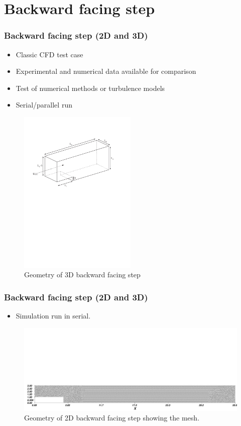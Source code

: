 \section{Backward facing step}

\begin{frame}
    \frametitle{Backward facing step (2D and 3D)}
\begin{itemize}
\item Classic CFD test case
\item Experimental and numerical data available for comparison
\item Test of numerical methods or turbulence models
\item Serial/parallel run
\end{itemize}
\begin{figure}
\centering
\includegraphics[width=0.5\textwidth]{./backward_facing_step/backward_facing_step_3d-schematic}
\caption{Geometry of 3D backward facing step}
\end{figure}
\end{frame}
%
\begin{frame}
    \frametitle{Backward facing step (2D and 3D)}
\begin{itemize}
\item Simulation run in serial.
\end{itemize}
\begin{figure}
\centering
\includegraphics[width=1.0\textwidth]{./backward_facing_step/backward_facing_step_2d-mesh}
\caption{Geometry of 2D backward facing step showing the mesh.}
\end{figure}
\end{frame}
